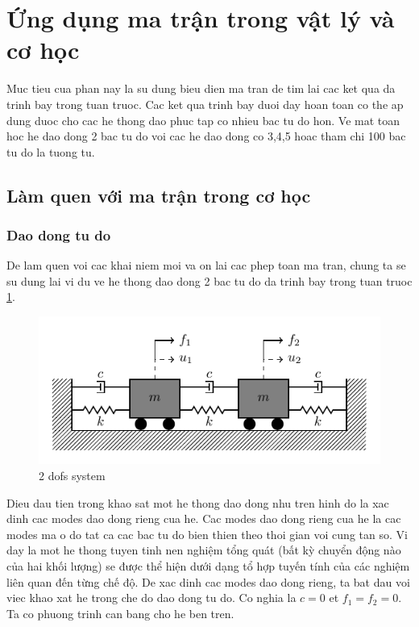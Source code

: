 \section{Ứng dụng ma trận trong vật lý và cơ học}\label{sec_1}

Muc tieu cua phan nay la su dung bieu dien ma tran de tim lai cac ket qua da trinh bay trong tuan truoc. Cac ket qua trinh bay duoi day hoan toan co the ap dung duoc cho cac he thong dao phuc tap co nhieu bac tu do hon. Ve mat toan hoc he dao dong 2 bac tu do voi cac he dao dong co 3,4,5 hoac tham chi 100 bac tu do la tuong tu.

\subsection{Làm quen với ma trận trong cơ học}
\subsubsection{Dao dong tu do}

De lam quen voi cac khai niem moi va on lai cac phep toan ma tran, chung ta se su dung lai vi du ve he thong dao dong 2 bac tu do da trinh bay trong tuan truoc \cref{fig_2dofs}.

\begin{figure}[htbp]
    \centering
    \includegraphics[width=1.\textwidth]{Tuan6/figure/mass_spring_damper_2dofs.pdf}
    \caption{2 dofs system}
    \label{fig_2dofs}
\end{figure}

Dieu dau tien trong khao sat mot he thong dao dong nhu tren hinh do la xac dinh cac modes dao dong rieng cua he. Cac modes dao dong rieng cua he la cac modes ma o do tat ca cac bac tu do bien thien theo thoi gian voi cung tan so. Vi day la mot he thong tuyen tinh nen nghiệm tổng quát (bất kỳ chuyển động nào của hai khối lượng) se được thể hiện dưới dạng tổ hợp tuyến tính của các nghiệm liên quan đến từng chế độ. De xac dinh cac modes dao dong rieng, ta bat dau voi viec khao xat he trong che do dao dong tu do. Co nghia la $c=0$ et $f_1=f_2=0$. Ta co phuong trinh can bang cho he ben tren.

